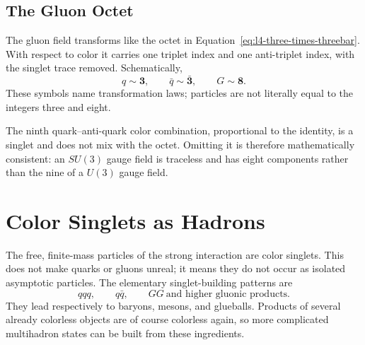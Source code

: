 \subsection{The Gluon Octet}

The gluon field transforms like the octet in
Equation~\eqref{eq:l4-three-times-threebar}. With respect to color it carries
one triplet index and one anti-triplet index, with the singlet trace removed.
Schematically,
\begin{equation}
q\sim\boldsymbol 3,
\qquad
\bar q\sim\bar{\boldsymbol 3},
\qquad
G\sim\boldsymbol 8.
\end{equation}
These symbols name transformation laws; particles are not literally equal to
the integers three and eight.

The ninth quark--anti-quark color combination, proportional to the identity,
is a singlet and does not mix with the octet. Omitting it is therefore
mathematically consistent: an \(SU(3)\) gauge field is traceless and has eight
components rather than the nine of a \(U(3)\) gauge field.

\begin{classroomqa}
\end{classroomqa}

\section{Color Singlets as Hadrons}

The free, finite-mass particles of the strong interaction are color singlets.
This does not make quarks or gluons unreal; it means they do not occur as
isolated asymptotic particles. The elementary singlet-building patterns are
\begin{equation}
qqq,
\qquad
q\bar q,
\qquad
GG\ \text{and higher gluonic products}.
\end{equation}
They lead respectively to baryons, mesons, and glueballs. Products of several
already colorless objects are of course colorless again, so more complicated
multihadron states can be built from these ingredients.

\begin{classroomqa}
\end{classroomqa}

